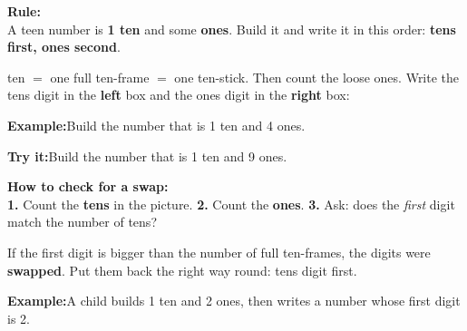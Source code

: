 \documentclass[12pt]{article}
\begin{document}


\begin{formulabox}
\textbf{Rule:}\\[4pt]
A teen number is \textbf{1 ten} and some \textbf{ones}.
Build it and write it in this order: \textbf{tens first, ones second}.\par
{} ten $=$ one full ten-frame $=$ one ten-stick. Then count the loose ones.
Write the tens digit in the \textbf{left} box and the ones digit in the
\textbf{right} box: \,
\end{formulabox}

\begin{examplebox}
\textbf{Example:}\quad Build the number that is 1 ten and 4 ones.
\end{examplebox}

\begin{tryitbox}
\textbf{Try it:}\quad Build the number that is 1 ten and 9 ones.\\[2pt]
\end{tryitbox}


\begin{formulabox}
\textbf{How to check for a swap:}\\[4pt]
\textbf{1.} Count the \textbf{tens} in the picture. \quad
\textbf{2.} Count the \textbf{ones}. \quad
\textbf{3.} Ask: does the \emph{first} digit match the number of tens?\par
\smallskip
If the first digit is bigger than the number of full ten-frames, the digits were
\textbf{swapped}. Put them back the right way round: tens digit first.
\end{formulabox}

\begin{examplebox}
\textbf{Example:}\quad A child builds 1 ten and 2 ones, then writes a number whose
first digit is 2.
\end{examplebox}
\end{document}
